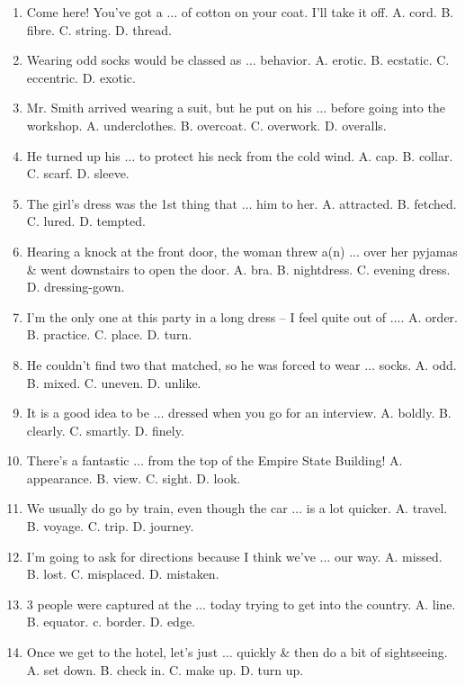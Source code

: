 \documentclass{article}
\numberwithin{equation}{section}
\begin{document}
\begin{enumerate}[leftmargin=8mm]
	\item Come here! You've got a $\ldots$ of cotton on your coat. I'll take it off. {\sf A.} cord. {\sf B.} fibre. {\sf C.} string. {\sf D.} thread.
	\item Wearing odd socks would be classed as $\ldots$ behavior. {\sf A.} erotic. {\sf B.} ecstatic. {\sf C.} eccentric. {\sf D.} exotic.
	\item Mr. Smith arrived wearing a suit, but he put on his $\ldots$ before going into the workshop. {\sf A.} underclothes. {\sf B.} overcoat. {\sf C.} overwork. {\sf D.} overalls.
	\item He turned up his $\ldots$ to protect his neck from the cold wind. {\sf A.} cap. {\sf B.} collar. {\sf C.} scarf. {\sf D.} sleeve.
	\item The girl's dress was the 1st thing that $\ldots$ him to her. {\sf A.} attracted. {\sf B.} fetched. {\sf C.} lured. {\sf D.} tempted.
	\item Hearing a knock at the front door, the woman threw a(n) $\ldots$ over her pyjamas \& went downstairs to open the door. {\sf A.} bra. {\sf B.} nightdress. {\sf C.} evening dress. {\sf D.} dressing-gown.
	\item I'm the only one at this party in a long dress -- I feel quite out of $\ldots$. {\sf A.} order. {\sf B.} practice. {\sf C.} place. {\sf D.} turn.
	\item He couldn't find two that matched, so he was forced to wear $\ldots$ socks. {\sf A.} odd. {\sf B.} mixed. {\sf C.} uneven. {\sf D.} unlike.
	\item It is a good idea to be $\ldots$ dressed when you go for an interview. {\sf A.} boldly. {\sf B.} clearly. {\sf C.} smartly. {\sf D.} finely.
	\item There's a fantastic $\ldots$ from the top of the Empire State Building! {\sf A.} appearance. {\sf B.} view. {\sf C.} sight. {\sf D.} look.
	\item We usually do go by train, even though the car $\ldots$ is a lot quicker. {\sf A.} travel. {\sf B.} voyage. {\sf C.} trip. {\sf D.} journey.
	\item I'm going to ask for directions because I think we've $\ldots$ our way. {\sf A.} missed. {\sf B.} lost. {\sf C.} misplaced. {\sf D.} mistaken.
	\item 3 people were captured at the $\ldots$ today trying to get into the country. {\sf A.} line. {\sf B.} equator. c. border. {\sf D.} edge.
	\item Once we get to the hotel, let's just $\ldots$ quickly \& then do a bit of sightseeing. {\sf A.} set down. {\sf B.} check in. {\sf C.} make up. {\sf D.} turn up.

\end{enumerate}
\end{document}
